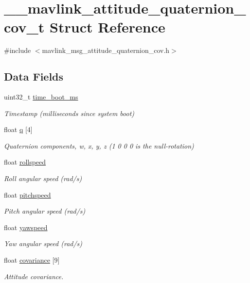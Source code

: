 \hypertarget{struct____mavlink__attitude__quaternion__cov__t}{\section{\+\_\+\+\_\+mavlink\+\_\+attitude\+\_\+quaternion\+\_\+cov\+\_\+t Struct Reference}
\label{struct____mavlink__attitude__quaternion__cov__t}
}


{\ttfamily \#include $<$mavlink\+\_\+msg\+\_\+attitude\+\_\+quaternion\+\_\+cov.\+h$>$}

\subsection*{Data Fields}
\begin{DoxyCompactItemize}
\item 
uint32\+\_\+t \hyperlink{struct____mavlink__attitude__quaternion__cov__t_a5404678da915bb511086af8e798563c1}{time\+\_\+boot\+\_\+ms}
\begin{DoxyCompactList}\small\item\em Timestamp (milliseconds since system boot) \end{DoxyCompactList}\item 
float \hyperlink{struct____mavlink__attitude__quaternion__cov__t_a200612445c86c19ecb2aa6e01a96c900}{q} \mbox{[}4\mbox{]}
\begin{DoxyCompactList}\small\item\em Quaternion components, w, x, y, z (1 0 0 0 is the null-\/rotation) \end{DoxyCompactList}\item 
float \hyperlink{struct____mavlink__attitude__quaternion__cov__t_a0443969a35d8ad3bb1566c3ef0f40dcd}{rollspeed}
\begin{DoxyCompactList}\small\item\em Roll angular speed (rad/s) \end{DoxyCompactList}\item 
float \hyperlink{struct____mavlink__attitude__quaternion__cov__t_addde6c4e079d510dd0b941310f63c612}{pitchspeed}
\begin{DoxyCompactList}\small\item\em Pitch angular speed (rad/s) \end{DoxyCompactList}\item 
float \hyperlink{struct____mavlink__attitude__quaternion__cov__t_af11fe8bb515cdb575ceeb2cc21dc16ee}{yawspeed}
\begin{DoxyCompactList}\small\item\em Yaw angular speed (rad/s) \end{DoxyCompactList}\item 
float \hyperlink{struct____mavlink__attitude__quaternion__cov__t_a2697dc993527becdcaa0866513c9c01c}{covariance} \mbox{[}9\mbox{]}
\begin{DoxyCompactList}\small\item\em Attitude covariance. \end{DoxyCompactList}\end{DoxyCompactItemize}


